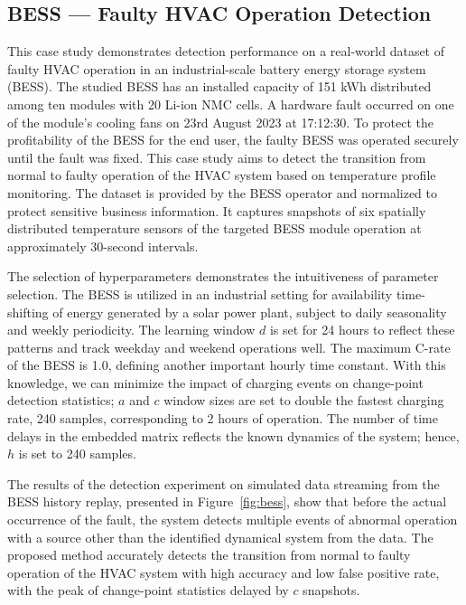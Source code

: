 \subsection{BESS --- Faulty HVAC Operation Detection}
This case study demonstrates detection performance on a real-world dataset of faulty HVAC operation in an industrial-scale battery energy storage system (BESS). The studied BESS has an installed capacity of 151 kWh distributed among ten modules with 20 Li-ion NMC cells. A hardware fault occurred on one of the module's cooling fans on 23rd August 2023 at 17:12:30. To protect the profitability of the BESS for the end user, the faulty BESS was operated securely until the fault was fixed. This case study aims to detect the transition from normal to faulty operation of the HVAC system based on temperature profile monitoring. The dataset is provided by the BESS operator and normalized to protect sensitive business information. It captures snapshots of six spatially distributed temperature sensors of the targeted BESS module operation at approximately 30-second intervals.

The selection of hyperparameters demonstrates the intuitiveness of parameter selection. The BESS is utilized in an industrial setting for availability time-shifting of energy generated by a solar power plant, subject to daily seasonality and weekly periodicity. The learning window \(d\) is set for 24 hours to reflect these patterns and track weekday and weekend operations well. The maximum C-rate of the BESS is 1.0, defining another important hourly time constant. With this knowledge, we can minimize the impact of charging events on change-point detection statistics; \(a\) and \(c\) window sizes are set to double the fastest charging rate, 240 samples, corresponding to 2 hours of operation. The number of time delays in the embedded matrix reflects the known dynamics of the system; hence, \(h\) is set to 240 samples.

The results of the detection experiment on simulated data streaming from the BESS history replay, presented in Figure~\ref{fig:bess}, show that before the actual occurrence of the fault, the system detects multiple events of abnormal operation with a source other than the identified dynamical system from the data. The proposed method accurately detects the transition from normal to faulty operation of the HVAC system with high accuracy and low false positive rate, with the peak of change-point statistics delayed by \(c\) snapshots.

